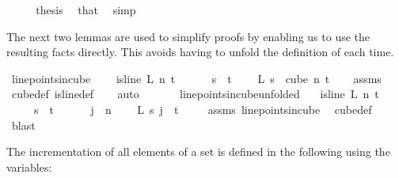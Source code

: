 \begin{isabellebody}
\ \ \isamarkupfalse%
\ \isamarkupfalse%
\ {\isacharquery}{\kern0pt}thesis\ \isamarkupfalse%
\ that\ \isamarkupfalse%
\ simp\isanewline
{}\isamarkupfalse%
%
\endisatagproof
{\isafoldproof}%
%
\isadelimproof
%
\endisadelimproof
%
\begin{isamarkuptext}%
The next two lemmas are used to simplify proofs by enabling us to use the resulting facts directly. This avoids having to unfold the definition of  each time.%
\end{isamarkuptext}\isamarkuptrue%
\isamarkupfalse%
\ line{\isacharunderscore}{\kern0pt}points{\isacharunderscore}{\kern0pt}in{\isacharunderscore}{\kern0pt}cube{\isacharcolon}{\kern0pt}\ \isanewline
\ \ \ {\isachardoublequoteopen}is{\isacharunderscore}{\kern0pt}line\ L\ n\ t{\isachardoublequoteclose}\ \isanewline
\ \ \ \ \ {\isachardoublequoteopen}s\ {\isacharless}{\kern0pt}\ t{\isachardoublequoteclose}\ \isanewline
\ \ \ {\isachardoublequoteopen}L\ s\ {\isasymin}\ cube\ n\ t{\isachardoublequoteclose}\isanewline
%
\isadelimproof
\ \ %
\endisadelimproof
%
\isatagproof
{}\isamarkupfalse%
\ assms\ \isamarkupfalse%
\ cube{\isacharunderscore}{\kern0pt}def\ is{\isacharunderscore}{\kern0pt}line{\isacharunderscore}{\kern0pt}def\isanewline
\ \ \isamarkupfalse%
\ auto%
\endisatagproof
{\isafoldproof}%
%
\isadelimproof
\ \ \ \ \ \isanewline
%
\endisadelimproof
\isanewline
{}\isamarkupfalse%
\ line{\isacharunderscore}{\kern0pt}points{\isacharunderscore}{\kern0pt}in{\isacharunderscore}{\kern0pt}cube{\isacharunderscore}{\kern0pt}unfolded{\isacharcolon}{\kern0pt}\isanewline
\ \ \ {\isachardoublequoteopen}is{\isacharunderscore}{\kern0pt}line\ L\ n\ t{\isachardoublequoteclose}\ \isanewline
\ \ \ \ \ {\isachardoublequoteopen}s\ {\isacharless}{\kern0pt}\ t{\isachardoublequoteclose}\ \isanewline
\ \ \ \ \ {\isachardoublequoteopen}j\ {\isacharless}{\kern0pt}\ n{\isachardoublequoteclose}\ \isanewline
\ \ \ {\isachardoublequoteopen}L\ s\ j\ {\isasymin}\ {\isacharbraceleft}{\kern0pt}{\isachardot}{\kern0pt}{\isachardot}{\kern0pt}{\isacharless}{\kern0pt}t{\isacharbraceright}{\kern0pt}{\isachardoublequoteclose}\ \isanewline
%
\isadelimproof
\ \ %
\endisadelimproof
%
\isatagproof
{}\isamarkupfalse%
\ assms\ line{\isacharunderscore}{\kern0pt}points{\isacharunderscore}{\kern0pt}in{\isacharunderscore}{\kern0pt}cube\ \isamarkupfalse%
\ cube{\isacharunderscore}{\kern0pt}def\ \isamarkupfalse%
\ blast%
\endisatagproof
{\isafoldproof}%
%
\isadelimproof
%
\endisadelimproof
%
\begin{isamarkuptext}%
The incrementation of all elements of a set is defined in the following using the variables:


\end{isamarkuptext}
\end{isabellebody}
